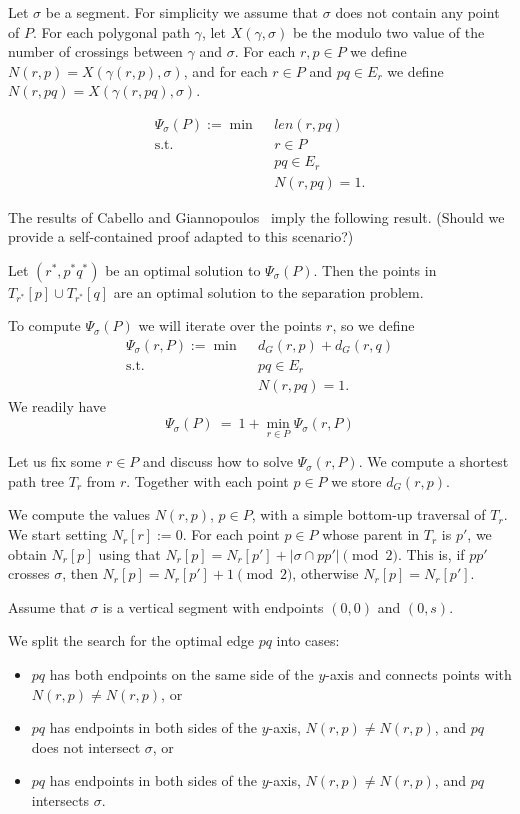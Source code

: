 \documentclass[a4paper,USenglish,numberwithinsect]{lipics}
\def\curve{\gamma}
\def\length{\mathit{len}}
\begin{document}
Let $\sigma$ be a segment. For simplicity we assume that $\sigma$ does not
contain any point of $P$. For each polygonal path $\gamma$, let $X(\gamma,\sigma)$ be the
modulo two value of the number of crossings between $\gamma$ and $\sigma$.
For each $r,p\in P$ we define $N(r,p)=X(\curve(r,p),\sigma)$, and 
for each $r\in P$ and $pq\in E_r$ we define $N(r,pq)=X(\curve(r,pq),\sigma)$.

\begin{align*}
	\Psi_\sigma(P) := \min ~~& \length(r,pq)\\
	 \mbox{s.t.}~~ & r\in P\\
				&	pq\in E_r\\
				&	N(r,pq)=1. 
\end{align*}

The results of Cabello and Giannopoulos~\cite{aa} imply the following result.
(Should we provide a self-contained proof adapted to this scenario?)

\begin{theorem}
	Let $(r^*,p^*q^*)$ be an optimal solution to $\Psi_\sigma(P)$.
	Then the points in $T_{r^*}[p]\cup T_{r^*}[q]$ are an optimal solution
	to the separation problem.
\end{theorem}

To compute $\Psi_\sigma(P)$ we will iterate over the points $r$, so we define
\begin{align*}
	\Psi_\sigma(r,P) := \min ~~& d_G(r,p)+d_G(r,q) \\
	 \mbox{s.t.}~~ & pq\in E_r\\
				&	N(r,pq)=1. 
\end{align*}
We readily have
\[
	\Psi_\sigma(P) ~=~ 1+ \min_{r\in P} \Psi_\sigma(r,P)
\]

Let us fix some $r\in P$ and discuss how to solve $\Psi_\sigma(r,P)$. 
We compute a shortest path tree $T_r$ from $r$. Together with each
point $p\in P$ we store $d_G(r,p)$.

We compute the values $N(r,p)$, $p\in P$, with a simple bottom-up traversal of $T_r$.
We start setting $N_r[r]:=0$. For each point $p\in P$ whose parent in $T_r$ is $p'$,
we obtain $N_r[p]$ using that $N_r[p]=N_r[p']+ |\sigma\cap pp'| \pmod 2$.
This is, if $pp'$ crosses $\sigma$, then $N_r[p]=N_r[p']+1 \pmod 2$, otherwise
$N_r[p]=N_r[p']$.

Assume that $\sigma$ is a vertical segment with endpoints $(0,0)$ and $(0,s)$.

We split the search for the optimal edge $pq$ into cases: 
\begin{itemize}
	\item $pq$ has both endpoints on the same side of the $y$-axis and 
		connects points with $N(r,p)\neq N(r,p)$, or
	\item $pq$ has endpoints in both sides of the $y$-axis, $N(r,p)\neq N(r,p)$,
		and $pq$ does not intersect $\sigma$, or
	\item $pq$ has endpoints in both sides of the $y$-axis, $N(r,p)\neq N(r,p)$,
		and $pq$ intersects $\sigma$.
\end{itemize}
\end{document}
